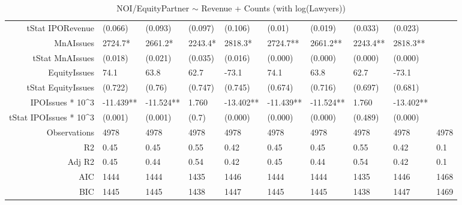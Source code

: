 \begin{table}[ht]
\begin{tabular}{rlllllllll}
  tStat IPORevenue & (0.066) & (0.093) & (0.097) & (0.106) & (0.01) & (0.019) & (0.033) & (0.023) &  \\ 
  MnAIssues & 2724.7* & 2661.2* & 2243.4* & 2818.3* & 2724.7** & 2661.2** & 2243.4** & 2818.3** &  \\ 
  tStat MnAIssues & (0.018) & (0.021) & (0.035) & (0.016) & (0.000) & (0.000) & (0.000) & (0.000) &  \\ 
  EquityIssues & 74.1 & 63.8 & 62.7 & -73.1 & 74.1 & 63.8 & 62.7 & -73.1 &  \\ 
  tStat EquityIssues & (0.722) & (0.76) & (0.747) & (0.745) & (0.674) & (0.716) & (0.697) & (0.681) &  \\ 
  IPOIssues * 10^3 & -11.439** & -11.524** & 1.760 & -13.402** & -11.439** & -11.524** & 1.760 & -13.402** &  \\ 
  tStat IPOIssues * 10^3 & (0.001) & (0.001) & (0.7) & (0.000) & (0.000) & (0.000) & (0.489) & (0.000) &  \\ 
  Observations & 4978 & 4978 & 4978 & 4978 & 4978 & 4978 & 4978 & 4978 & 4978 \\ 
  R2 & 0.45 & 0.45 & 0.55 & 0.42 & 0.45 & 0.45 & 0.55 & 0.42 & 0.1 \\ 
  Adj R2 & 0.45 & 0.44 & 0.54 & 0.42 & 0.45 & 0.44 & 0.54 & 0.42 & 0.1 \\ 
  AIC & 1444 & 1444 & 1435 & 1446 & 1444 & 1444 & 1435 & 1446 & 1468 \\ 
  BIC & 1445 & 1445 & 1438 & 1447 & 1445 & 1445 & 1438 & 1447 & 1469 \\ 
   \hline
\end{tabular}
\caption{NOI/EquityPartner $\sim$ Revenue + Counts (with log(Lawyers))} 
\end{table}
